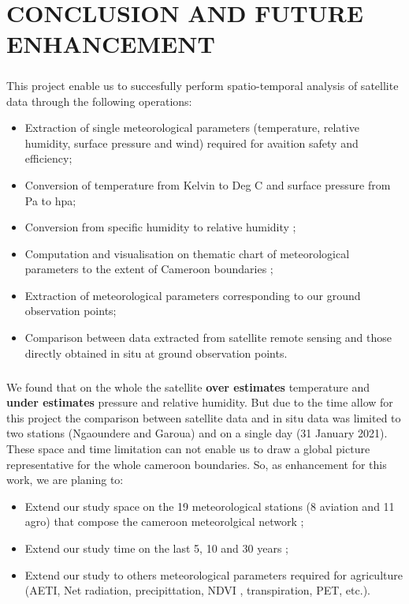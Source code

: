 \chapter*{\normalsize{\textbf{CONCLUSION AND FUTURE ENHANCEMENT}}}
\paragraph{}
This project enable us to succesfully perform spatio-temporal analysis of satellite data through the following operations:
\begin{itemize} 
    \item Extraction of single meteorological parameters (temperature, relative humidity, surface pressure and  wind) required for avaition safety and efficiency;
    \item Conversion of temperature from Kelvin to Deg C and   surface pressure from Pa to hpa;
    \item Conversion from specific humidity to relative humidity ;
    \item Computation and visualisation on thematic  chart  of meteorological parameters  to the extent of Cameroon boundaries ;
    \item Extraction of meteorological parameters  corresponding to our ground observation points;
    \item Comparison between data extracted from satellite remote sensing and those directly obtained in situ at ground observation points. 
\end{itemize}
\paragraph{}
We found that on the whole the satellite \textbf {over estimates} temperature and \textbf {under estimates} pressure and relative humidity. \newline
But due to the time allow for this project  the comparison between satellite data and in situ data was limited to two stations (Ngaoundere and Garoua) and on a single day (31 January 2021). \newline
These space  and time  limitation can not enable us to draw a global picture representative for the whole cameroon boundaries.
So, as enhancement for this work, we are planing to:
\begin{itemize} 
    \item Extend our study space on  the 19 meteorological stations (8 aviation and 11 agro) that compose  the cameroon meteorolgical network ;
    \item Extend our study time on the last 5, 10 and 30 years ;
    \item Extend our study to others meteorological parameters required for agriculture (AETI, Net radiation, precipittation,  NDVI , transpiration, PET, etc.).
\end{itemize}
